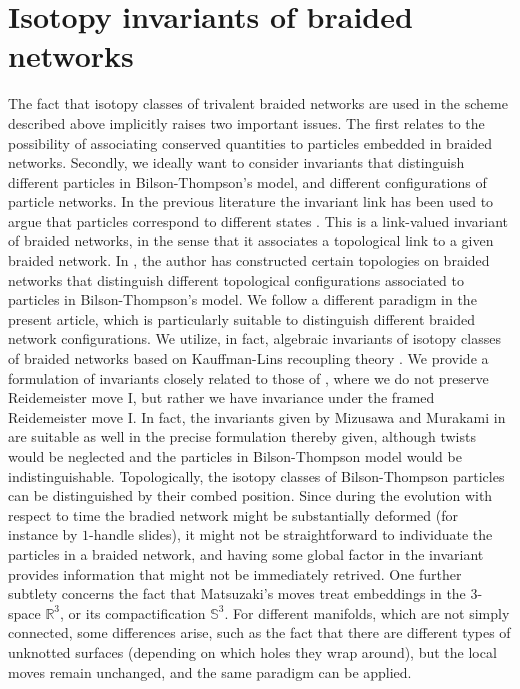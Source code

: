 \documentclass[aps,nofootinbib,amsfonts,superscriptaddress]{revtex4}
\begin{document}

\section{Isotopy invariants of braided networks}

The fact that isotopy classes of trivalent braided networks are used in the scheme described above implicitly raises two important issues. The first relates to the possibility of associating conserved quantities to particles embedded in braided networks. Secondly, we ideally want to consider invariants that distinguish different particles in Bilson-Thompson's model, and different configurations of particle networks. In the previous literature the invariant link has been used to argue that particles correspond to different states \cite{BT2}. This is a link-valued invariant of braided networks, in the sense that it associates a topological link to a given braided network. In \cite{JH}, the author has constructed certain topologies on braided networks that distinguish different topological configurations associated to particles in Bilson-Thompson's model. We follow a different paradigm in the present article, which is particularly suitable to distinguish different braided network configurations. We utilize, in fact, algebraic invariants of isotopy classes of braided networks based on Kauffman-Lins recoupling theory \cite{KL}. We provide a formulation of invariants closely related to those of \cite{Yokota,Handlebodies}, where we do not preserve Reidemeister move I, but rather we have invariance under the framed Reidemeister move I. In fact, the invariants given by Mizusawa and Murakami in \cite{Handlebodies} are suitable as well in the precise formulation thereby given, although twists would be neglected and the particles in Bilson-Thompson model would be indistinguishable. Topologically, the isotopy classes of Bilson-Thompson particles can be distinguished by their combed position. Since during the evolution with respect to time the bradied network might be substantially deformed (for instance by $1$-handle slides), it might not be straightforward to individuate the particles in a braided network, and having some global factor in the invariant provides information that might not be immediately retrived.  One further subtlety concerns the fact that Matsuzaki's moves treat embeddings in the $3$-space $\mathbb R^3$, or its compactification $\mathbb S^3$. For different manifolds, which are not simply connected, some differences arise, such as the fact that there are different types of unknotted surfaces (depending on which holes they wrap around), but the local moves remain unchanged, and the same paradigm can be applied.\\
\end{document}
